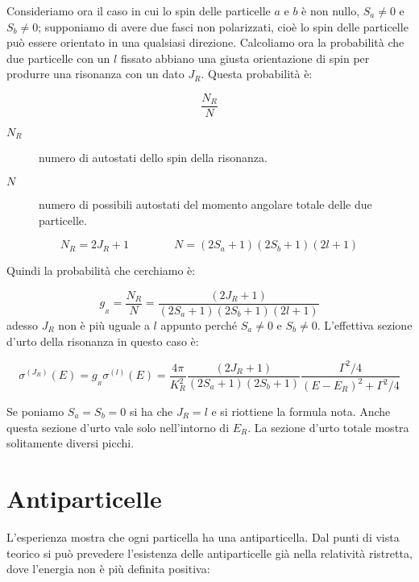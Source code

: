 Consideriamo ora il caso in cui lo spin delle particelle $a$ e $b$ è non nullo,
$S_a \ne 0$ e $S_b \ne 0$; supponiamo di avere due fasci non polarizzati, cioè
lo spin delle particelle può essere orientato in una qualsiasi direzione.
Calcoliamo ora la probabilità che due particelle con un $l$ fissato abbiano una
giusta orientazione di spin per produrre una risonanza con un dato $J_R$. Questa
probabilità è:

\begin{equation*}
\dfrac{N_R}{N} 
\end{equation*}
\begin{description}
\item[$N_R$] numero di autostati dello spin della risonanza.
\item[$N$] numero di possibili autostati del momento angolare totale delle due
  particelle.
\end{description}

\begin{equation*}
N_R = 2 J_R + 1	\qquad  \qquad	N = (2 S_a + 1)(2 S_b + 1)(2 l + 1)
\end{equation*}

Quindi la probabilità che cerchiamo è:

\begin{equation*}
g_{_{R}} = \dfrac{N_R}{N} = \dfrac{(2 J_R + 1)}{(2 S_a + 1)(2 S_b + 1)(2 l + 1)}
\end{equation*}
adesso $J_R$ non è più uguale a $l$ appunto perché $S_a \ne 0$ e $S_b \ne 0$.
L'effettiva sezione d'urto della risonanza in questo caso è:

\begin{equation*}
\sigma^{(J_R)} (E) = g_{_{R}} \sigma^{(l)} (E) = \dfrac{4 \pi}{K^2_R} \dfrac{(2 
J_R +1)}{(2 S_a + 1)(2 S_b + 1)} \dfrac{\Gamma^2 /4}{(E-E_R)^2 + \Gamma^2/4}
\end{equation*}

Se poniamo $S_a = S_b = 0$ si ha che $J_R = l$ e si riottiene la formula nota. 
Anche questa sezione d'urto vale solo nell'intorno di $E_R$. La sezione d'urto
totale mostra solitamente diversi picchi.

\chapter{Antiparticelle}
L'esperienza mostra che ogni particella ha una antiparticella. Dal punti di
vista teorico si può prevedere l'esistenza delle antiparticelle già nella
relatività ristretta, dove l'energia non è più definita positiva:

